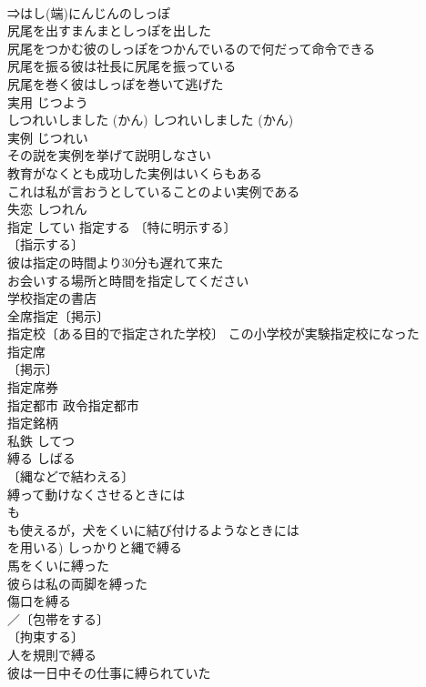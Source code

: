 \documentclass[8pt]{extreport}
\begin{document}
\begin{CJK}{UTF8}{min}
\\	⇒はし(端)にんじんのしっぽ
\\	尻尾を出すまんまとしっぽを出した
\\	尻尾をつかむ彼のしっぽをつかんでいるので何だって命令できる
\\	尻尾を振る彼は社長に尻尾を振っている
\\	尻尾を巻く彼はしっぽを巻いて逃げた
\\	実用	じつよう	
\\	しつれいしました (かん)	しつれいしました (かん)	
\\	実例	じつれい	
\\	その説を実例を挙げて説明しなさい 
\\	教育がなくとも成功した実例はいくらもある 
\\	これは私が言おうとしていることのよい実例である 
\\	失恋	しつれん	
\\	指定	してい	指定する 〔特に明示する〕
\\	〔指示する〕
\\	彼は指定の時間より30分も遅れて来た 
\\	お会いする場所と時間を指定してください 
\\	学校指定の書店 
\\	全席指定〔掲示〕 
\\	指定校〔ある目的で指定された学校〕 この小学校が実験指定校になった 
\\	指定席 
\\	〔掲示〕
\\	指定席券 
\\	指定都市 政令指定都市 
\\	指定銘柄 
\\	私鉄	してつ	
\\	縛る	しばる	
\\	〔縄などで結わえる〕
\\	縛って動けなくさせるときには
\\	も
\\	も使えるが，犬をくいに結び付けるようなときには
\\	を用いる) しっかりと縄で縛る 
\\	馬をくいに縛った 
\\	彼らは私の両脚を縛った 
\\	傷口を縛る 
\\	／〔包帯をする〕
\\	〔拘束する〕
\\	人を規則で縛る 
\\	彼は一日中その仕事に縛られていた 

\end{CJK}
\end{document}
